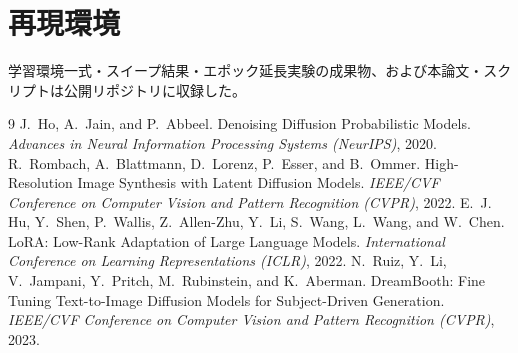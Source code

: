 \documentclass[10pt,twocolumn]{ltjsarticle}
\begin{document}
\section{再現環境}
学習環境一式・スイープ結果・エポック延長実験の成果物、および本論文・スクリプトは公開リポジトリに収録した。

\begin{thebibliography}{9}
 J.~Ho, A.~Jain, and P.~Abbeel. Denoising Diffusion Probabilistic Models. \textit{Advances in Neural Information Processing Systems (NeurIPS)}, 2020.
 R.~Rombach, A.~Blattmann, D.~Lorenz, P.~Esser, and B.~Ommer. High-Resolution Image Synthesis with Latent Diffusion Models. \textit{IEEE/CVF Conference on Computer Vision and Pattern Recognition (CVPR)}, 2022.
 E.~J. Hu, Y.~Shen, P.~Wallis, Z.~Allen-Zhu, Y.~Li, S.~Wang, L.~Wang, and W.~Chen. LoRA: Low-Rank Adaptation of Large Language Models. \textit{International Conference on Learning Representations (ICLR)}, 2022.
 N.~Ruiz, Y.~Li, V.~Jampani, Y.~Pritch, M.~Rubinstein, and K.~Aberman. DreamBooth: Fine Tuning Text-to-Image Diffusion Models for Subject-Driven Generation. \textit{IEEE/CVF Conference on Computer Vision and Pattern Recognition (CVPR)}, 2023.
\end{thebibliography}
\end{document}
